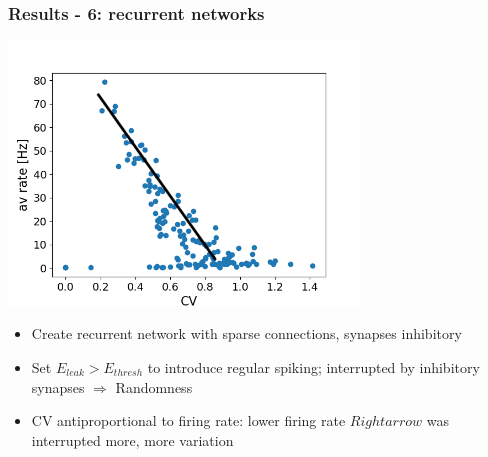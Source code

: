 \documentclass{beamer}
\begin{document}
\begin{frame}
	\frametitle{Results - 6: recurrent networks}
	\centering
	\includegraphics[width=0.7\textwidth]{figures/rate_CV.png}


	\begin{itemize}
		\item Create recurrent network with sparse connections, synapses inhibitory
		\item Set $E_{leak} > E_{thresh}$ to introduce regular spiking; interrupted
		by inhibitory synapses $\Rightarrow$ Randomness
		\item CV antiproportional to firing rate: lower firing rate $Rightarrow$ was
		interrupted more,  more variation
	\end{itemize}

\end{frame}
\end{document}
